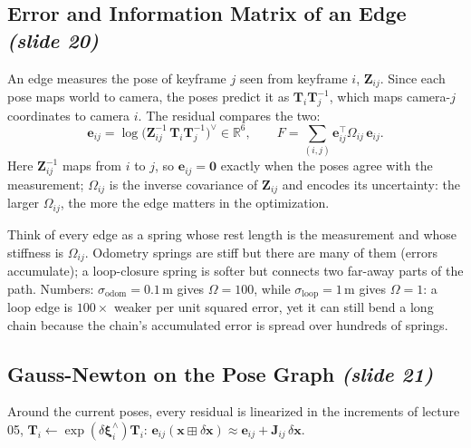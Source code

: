 \documentclass[11pt,a4paper]{article}
\newcommand{\slrs}[1]{\texorpdfstring{\emph{(slide #1)}}{(slide #1)}}
\newcommand{\R}{\mathbb{R}}
\newcommand{\be}{\mathbf{e}}
\newcommand{\bJ}{\mathbf{J}}
\newcommand{\bT}{\mathbf{T}}
\theoremstyle{definition}
\theoremstyle{plain}
\theoremstyle{remark}
\begin{document}
\subsection{Error and Information Matrix of an Edge \slrs{20}}
An edge measures the pose of keyframe $j$ seen from keyframe $i$, $\mathbf Z_{ij}$. Since each pose maps world to camera, the poses predict it as $\bT_i\bT_j^{-1}$, which maps camera-$j$ coordinates to camera $i$. The residual compares the two:
\[
\be_{ij}=\log\!\big(\mathbf Z_{ij}^{-1}\,\bT_i\bT_j^{-1}\big)^\vee\in\R^6,\qquad F=\sum_{(i,j)}\be_{ij}^\top\Omega_{ij}\,\be_{ij}.
\]
Here $\mathbf Z_{ij}^{-1}$ maps from $i$ to $j$, so $\be_{ij}=\mathbf 0$ exactly when the poses agree with the measurement; $\Omega_{ij}$ is the inverse covariance of $\mathbf Z_{ij}$ and encodes its uncertainty: the larger $\Omega_{ij}$, the more the edge matters in the optimization.
\begin{intuition}
Think of every edge as a spring whose rest length is the measurement and whose stiffness is $\Omega_{ij}$. Odometry springs are stiff but there are many of them (errors accumulate); a loop-closure spring is softer but connects two far-away parts of the path. Numbers: $\sigma_{\text{odom}}=0.1$\,m gives $\Omega=100$, while $\sigma_{\text{loop}}=1$\,m gives $\Omega=1$: a loop edge is $100\times$ weaker per unit squared error, yet it can still bend a long chain because the chain's accumulated error is spread over hundreds of springs.
\end{intuition}

\subsection{Gauss-Newton on the Pose Graph \slrs{21}}
Around the current poses, every residual is linearized in the increments of lecture 05, $\bT_i\leftarrow\exp(\delta\boldsymbol\xi_i^\wedge)\bT_i$: $\be_{ij}(\mathbf x\boxplus\delta\mathbf x)\approx\be_{ij}+\bJ_{ij}\,\delta\mathbf x$.
\end{document}
